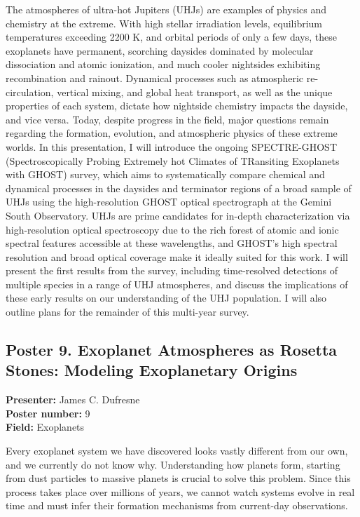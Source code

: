 The atmospheres of ultra-hot Jupiters (UHJs) are examples of physics and chemistry at the extreme. With high stellar irradiation levels, equilibrium temperatures exceeding 2200 K, and orbital periods of only a few days, these exoplanets have permanent, scorching daysides dominated by molecular dissociation and atomic ionization, and much cooler nightsides exhibiting recombination and rainout. Dynamical processes such as atmospheric re-circulation, vertical mixing, and global heat transport, as well as the unique properties of each system, dictate how nightside chemistry impacts the dayside, and vice versa. Today, despite progress in the field, major questions remain regarding the formation, evolution, and atmospheric physics of these extreme worlds. In this presentation, I will introduce the ongoing SPECTRE-GHOST (Spectroscopically Probing Extremely hot Climates of TRansiting Exoplanets with GHOST) survey, which aims to systematically compare chemical and dynamical processes in the daysides and terminator regions of a broad sample of UHJs using the high-resolution GHOST optical spectrograph at the Gemini South Observatory. UHJs are prime candidates for in-depth characterization via high-resolution optical spectroscopy due to the rich forest of atomic and ionic spectral features accessible at these wavelengths, and GHOST's high spectral resolution and broad optical coverage make it ideally suited for this work. I will present the first results from the survey, including time-resolved detections of multiple species in a range of UHJ atmospheres, and discuss the implications of these early results on our understanding of the UHJ population. I will also outline plans for the remainder of this multi-year survey.

\hypertarget{poster-abstract-talk-71}{}\label{poster-abstract-page-talk-71}
\subsection*{Poster 9. Exoplanet Atmospheres as Rosetta Stones: Modeling Exoplanetary Origins}
\textbf{Presenter:} James C. Dufresne\\
\textbf{Poster number:} 9\\
\textbf{Field:} Exoplanets

Every exoplanet system we have discovered looks vastly different from our own, and we currently do not know why. Understanding how planets form, starting from dust particles to massive planets is crucial to solve this problem. Since this process takes place over millions of years, we cannot watch systems evolve in real time and must infer their formation mechanisms from current-day observations.

